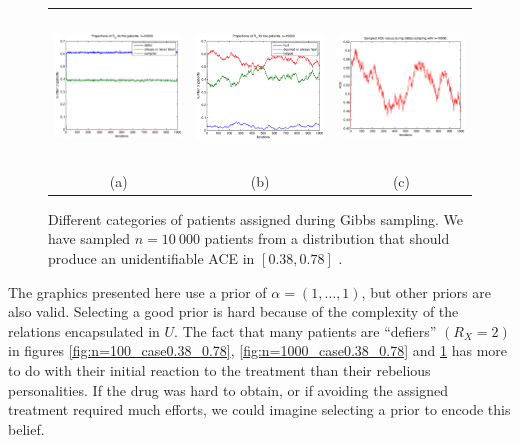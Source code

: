 \documentclass[a4paper, 10pt]{article}
\begin{document}
\begin{figure}
\begin{tabular}{ccc}
 \includegraphics[width=4.5cm,height=4cm,bb=103 240 500
555]{takingtype_case0.38_0.78_n=10000.eps} &
 \includegraphics[width=4.5cm,height=4cm,bb=103 240 500 555]
{healingtype_case0.38_0.78_n=10000.eps} &
 \includegraphics[width=4.5cm,height=4cm,bb=103 240
500 555]{sampledACEs_case0.38_0.78_n=10000.eps} \\
(a) & (b) & (c)
\end{tabular}
\caption{Different categories of patients assigned during Gibbs sampling. We
have sampled $n=10\ 000$ patients from a distribution that should produce an
unidentifiable ACE in $[0.38, 0.78]$ .}
\label{fig:n=10000_case0.38_0.78}
\end{figure}

The graphics presented here use a prior of $\alpha = (1, \ldots, 1)$, but other
priors are also valid. Selecting a good prior is hard because of the complexity
of the relations encapsulated in $U$. The fact that many patients are
``defiers'' $(R_X=2)$ in
figures \ref{fig:n=100_case0.38_0.78},
\ref{fig:n=1000_case0.38_0.78} and \ref{fig:n=10000_case0.38_0.78} has
more to do with their initial reaction to the treatment than their rebelious
personalities. If the drug was hard to obtain, or if
avoiding the assigned treatment required much efforts, we could imagine
selecting a prior to encode this belief.
\end{document}
